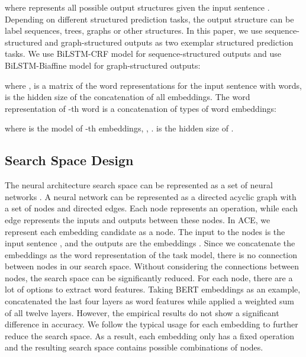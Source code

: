 \documentclass{article} \usepackage{iclr2021_conference,times}
\begin{document}
where  represents all possible output structures given the input sentence . Depending on different structured prediction tasks, the output structure  can be label sequences, trees, graphs or other structures. In this paper, we use sequence-structured and graph-structured outputs as two exemplar structured prediction tasks. We use BiLSTM-CRF model \citep{ma-hovy-2016-end,lample-etal-2016-neural} for sequence-structured outputs and use BiLSTM-Biaffine model \citep{dozat2016deep} for graph-structured outputs:

where ,  is a matrix of the word representations for the input sentence  with  words,  is the hidden size of the concatenation of all embeddings. The word representation  of -th word is a concatenation of  types of word embeddings:

where  is the model of -th embeddings, , .  is the hidden size of . 

\subsection{Search Space Design}
\label{sec:search_space}
The neural architecture search space can be represented as a set of neural networks \citep{elsken2019neural}. 
A neural network can be represented as a directed acyclic graph with a set of nodes and directed edges.
Each node represents an operation, while each edge represents the inputs and outputs between these nodes. 
In ACE, we represent each embedding candidate as a node. 
The input to the nodes is the input sentence , and the outputs are the embeddings . Since we concatenate the embeddings as the word representation of the task model, there is no connection between nodes in our search space. Without considering the connections between nodes, the search space can be significantly reduced. 
For each node, there are a lot of options to extract word features. 
Taking BERT embeddings as an example, \citet{devlin-etal-2019-bert} concatenated the last four layers as word features while \citet{kondratyuk-straka-2019-75} applied a weighted sum of all twelve layers. However, the empirical results \citep{devlin-etal-2019-bert} do not show a significant difference in accuracy. We follow the typical usage for each embedding to further reduce the search space. As a result, each embedding only has a fixed operation and the resulting search space contains  possible combinations of nodes.
\end{document}

